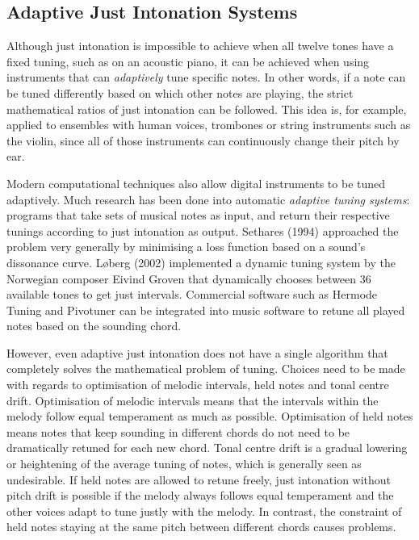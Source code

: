 \documentclass[a4paper]{article}
\begin{document}
\subsection{Adaptive Just Intonation Systems}
\label{intro_adaptive_ji}
Although just intonation is impossible to achieve when all twelve tones have a fixed tuning, such as on an acoustic piano, it can be achieved when using instruments that can \textit{adaptively} tune specific notes. In other words, if a note can be tuned differently based on which other notes are playing, the strict mathematical ratios of just intonation can be followed. This idea is, for example, applied to ensembles with human voices, trombones or string instruments such as the violin, since all of those instruments can continuously change their pitch by ear.\cite{van_de_craats_fis_1989}

Modern computational techniques also allow digital instruments to be tuned adaptively. Much research has been done into automatic \textit{adaptive tuning systems}: programs that take sets of musical notes as input, and return their respective tunings according to just intonation as output. Sethares (1994) approached the problem very generally by minimising a loss function based on a sound's dissonance curve.\cite{sethares_adaptive_1994} Løberg (2002) implemented a dynamic tuning system by the Norwegian composer Eivind Groven that dynamically chooses between 36 available tones to get just intervals.\cite{code_grovenmax_2002} Commercial software such as Hermode Tuning\cite{mohrlok_hermode_2003} and Pivotuner\cite{noauthor_pivotuner_nodate} can be integrated into music software to retune all played notes based on the sounding chord.

However, even adaptive just intonation does not have a single algorithm that completely solves the mathematical problem of tuning. Choices need to be made with regards to optimisation of melodic intervals, held notes and tonal centre drift. Optimisation of melodic intervals means that the intervals within the melody follow equal temperament as much as possible. Optimisation of held notes means notes that keep sounding in different chords do not need to be dramatically retuned for each new chord. Tonal centre drift is a gradual lowering or heightening of the average tuning of notes, which is generally seen as undesirable.\cite{dougherty_choral_2004, barbershop_harmony_society_contest_2022} If held notes are allowed to retune freely, just intonation without pitch drift is possible if the melody always follows equal temperament and the other voices adapt to tune justly with the melody.\cite{dougherty_choral_2004} In contrast, the constraint of held notes staying at the same pitch between different chords causes problems.
\end{document}
